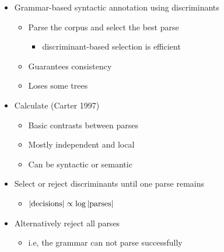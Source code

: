 \documentclass[a4paper,landscape,headrule,footrule,dvips]{foils}
\begin{document}
\begin{CJK}{UTF8}{min}
\begin{itemize}
\item Grammar-based syntactic annotation using discriminants
  \begin{itemize}
  \item Parse the corpus and select the best parse
    \begin{itemize}
    \item discriminant-based selection is efficient
    \end{itemize}
  \item Guarantees consistency
  \item Loses some trees
  \end{itemize}
\end{itemize}
\begin{itemize}
\item Calculate  (Carter 1997)
  \begin{itemize}
  \item Basic contrasts between parses
  \item Mostly independent and local
  \item Can be syntactic or semantic
  \end{itemize}
\item Select or reject discriminants until one parse remains
  \begin{itemize}
  \item $|{\textnormal{decisions}| \propto \log |\textnormal{parses}|}$
  \end{itemize}
\item Alternatively reject all parses
  \begin{itemize}
  \item i.e, the grammar can not parse successfully
  \end{itemize}
\end{itemize}




\end{CJK}
\end{document}
